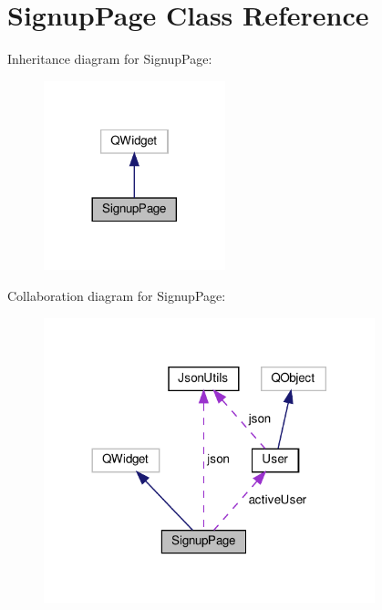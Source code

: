 \hypertarget{classSignupPage}{}\section{Signup\+Page Class Reference}
\label{classSignupPage}


Inheritance diagram for Signup\+Page\+:
\nopagebreak
\begin{figure}[H]
\begin{center}
\leavevmode
\includegraphics[width=149pt]{classSignupPage__inherit__graph}
\end{center}
\end{figure}


Collaboration diagram for Signup\+Page\+:
\nopagebreak
\begin{figure}[H]
\begin{center}
\leavevmode
\includegraphics[width=272pt]{classSignupPage__coll__graph}
\end{center}
\end{figure}
